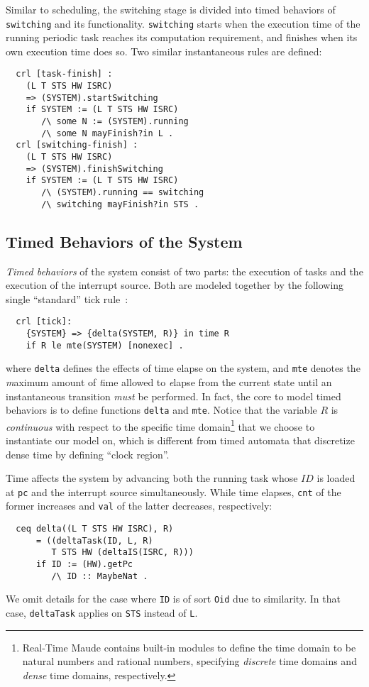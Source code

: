 \documentclass[10pt,journal,compsoc]{IEEEtran}
\begin{document}
Similar to scheduling, the switching stage is divided into timed
behaviors of \verb|switching| and its functionality. \verb|switching|
starts when the execution time of the running periodic task reaches
its computation requirement, and finishes when its own execution time
does so. Two similar instantaneous rules are defined:
\begin{verbatim}
  crl [task-finish] :
    (L T STS HW ISRC) 
    => (SYSTEM).startSwitching
    if SYSTEM := (L T STS HW ISRC)
       /\ some N := (SYSTEM).running
       /\ some N mayFinish?in L .
  crl [switching-finish] :
    (L T STS HW ISRC) 
    => (SYSTEM).finishSwitching
    if SYSTEM := (L T STS HW ISRC)
       /\ (SYSTEM).running == switching
       /\ switching mayFinish?in STS .
\end{verbatim}

\subsection{Timed Behaviors of the System}
\label{ss:timedbehavior}
\emph{Timed behaviors} of the system consist of two parts: the
execution of tasks and the execution of the interrupt source. Both are
modeled together by the following single ``standard'' tick
rule~\cite{DBLP:journals/entcs/OlveczkyM07a}:
\begin{verbatim}
  crl [tick]:
    {SYSTEM} => {delta(SYSTEM, R)} in time R 
    if R le mte(SYSTEM) [nonexec] .
\end{verbatim}
where \verb|delta| defines the effects of time elapse on the system,
and \verb|mte| denotes the \emph{m}aximum amount of \emph{t}ime
allowed to \emph{e}lapse from the current state until an instantaneous
transition \emph{must} be performed. In fact, the core to model timed
behaviors is to define functions \verb|delta| and \verb|mte|. Notice
that the variable $R$ is \emph{continuous} with respect to the
specific time domain\footnote{Real-Time Maude contains built-in
  modules to define the time domain to be natural numbers and rational
  numbers, specifying \emph{discrete} time domains and \emph{dense}
  time domains, respectively.}  that we choose to instantiate our
model on, which is different from timed automata that discretize dense
time by defining ``clock region''.

Time affects the system by advancing both the running task whose $ID$
is loaded at \verb|pc| and the interrupt source simultaneously.  While
time elapses, \verb|cnt| of the former increases and \verb|val| of the
latter decreases, respectively:
\begin{verbatim}
  ceq delta((L T STS HW ISRC), R)
      = ((deltaTask(ID, L, R) 
         T STS HW (deltaIS(ISRC, R)))
      if ID := (HW).getPc 
         /\ ID :: MaybeNat .
\end{verbatim}
We omit details for the case where \verb|ID| is of sort \verb|Oid| due
to similarity. In that case, \verb|deltaTask| applies on \verb|STS|
instead of \verb|L|.
\end{document}
